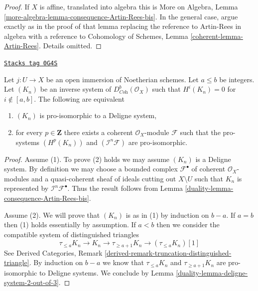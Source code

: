 \begin{proof}
If $X$ is affine, translated into algebra this is More on Algebra, Lemma
\ref{more-algebra-lemma-consequence-Artin-Rees-bis}.
In the general case, argue exactly as in the proof of that lemma
replacing the reference to Artin-Rees in algebra with a reference to
Cohomology of Schemes, Lemma \ref{coherent-lemma-Artin-Rees}.
Details omitted.
\end{proof}

\begin{lemma}
\label{duality-lemma-characterize-extension-by-zero-algebra}
\href{https://stacks.math.columbia.edu/tag/0G4S}{\texttt{Stacks tag 0G4S}}

Let $j : U \to X$ be an open immersion of Noetherian schemes.
Let $a \leq b$ be integers. Let $(K_n)$ be an inverse system of
$D^b_{\textit{Coh}}(\mathcal{O}_X)$
such that $H^i(K_n) = 0$ for $i \not \in [a, b]$.
The following are equivalent
\begin{enumerate}
\item $(K_n)$ is pro-isomorphic to a Deligne system,
\item for every $p \in \mathbf{Z}$ there exists a coherent
$\mathcal{O}_X$-module $\mathcal{F}$ such that the pro-systems
$(H^p(K_n))$ and $(\mathcal{I}^n\mathcal{F})$ are pro-isomorphic.
\end{enumerate}
\end{lemma}

\begin{proof}

Assume (1). To prove (2) holds we may assume $(K_n)$ is a Deligne system.
By definition we may choose a bounded complex $\mathcal{F}^\bullet$
of coherent $\mathcal{O}_X$-modules and a quasi-coherent
sheaf of ideals cutting out $X \setminus U$ such that
$K_n$ is represented by $\mathcal{I}^n\mathcal{F}^\bullet$.
Thus the result follows from Lemma \ref{duality-lemma-consequence-Artin-Rees-bis}.

\medskip\noindent
Assume (2). We will prove that $(K_n)$ is as in (1) by induction on
$b - a$. If $a = b$ then (1) holds essentially by assumption.
If $a < b$ then we consider the compatible system of
distinguished triangles
$$
\tau_{\leq a}K_n \to K_n \to \tau_{\geq a + 1}K_n \to (\tau_{\leq a}K_n)[1]
$$
See Derived Categories, Remark
\ref{derived-remark-truncation-distinguished-triangle}.
By induction on $b - a$ we know that $\tau_{\leq a}K_n$ and
$\tau_{\geq a + 1}K_n$ are pro-isomorphic to Deligne systems.
We conclude by Lemma \ref{duality-lemma-deligne-system-2-out-of-3}.
\end{proof}

